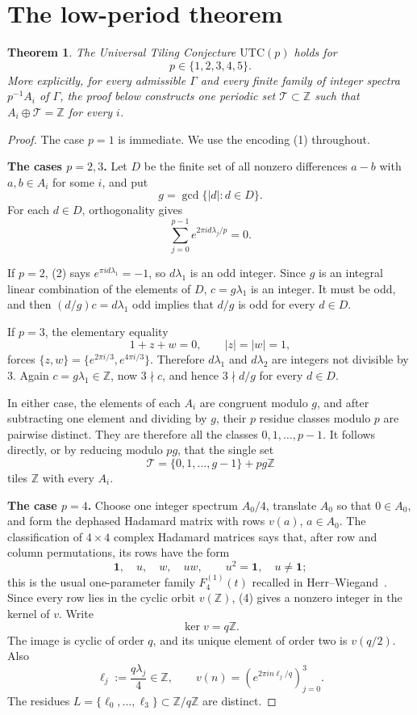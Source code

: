 \documentclass[11pt]{article}
\newtheorem{theorem}{Theorem}
\newcommand{\Z}{\mathbb Z}
\begin{document}
\section{The low-period theorem}

\begin{theorem}\label{main}
The Universal Tiling Conjecture $\mathrm{UTC}(p)$ holds for
\[
 p\in\{1,2,3,4,5\}.
\]
More explicitly, for every admissible $\Gamma$ and every finite family of
integer spectra $p^{-1}A_i$ of $\Gamma$, the proof below constructs one
periodic set $\mathcal T\subset\Z$ such that
$A_i\oplus\mathcal T=\Z$ for every $i$.
\end{theorem}

\begin{proof}
The case $p=1$ is immediate.  We use the encoding (1) throughout.

\medskip
\noindent\textbf{The cases $p=2,3$.}
Let $D$ be the finite set of all nonzero differences $a-b$ with
$a,b\in A_i$ for some $i$, and put
\[
 g=\gcd\{|d|:d\in D\}.
\]
For each $d\in D$, orthogonality gives
\[
 \sum_{j=0}^{p-1}e^{2\pi i d\lambda_j/p}=0.
 \tag{2}
\]

If $p=2$, (2) says
$e^{\pi i d\lambda_1}=-1$, so $d\lambda_1$ is an odd integer.  Since
$g$ is an integral linear combination of the elements of $D$,
$c=g\lambda_1$ is an integer.  It must be odd, and then
$(d/g)c=d\lambda_1$ odd implies that $d/g$ is odd for every $d\in D$.

If $p=3$, the elementary equality
\[
 1+z+w=0,\qquad |z|=|w|=1,
\]
forces $\{z,w\}=\{e^{2\pi i/3},e^{4\pi i/3}\}$.  Therefore
$d\lambda_1$ and $d\lambda_2$ are integers not divisible by $3$.
Again $c=g\lambda_1\in\Z$, now $3\nmid c$, and hence
$3\nmid d/g$ for every $d\in D$.

In either case, the elements of each $A_i$ are congruent modulo $g$, and
after subtracting one element and dividing by $g$, their $p$ residue
classes modulo $p$ are pairwise distinct.  They are therefore all the
classes $0,1,\ldots,p-1$.  It follows directly, or by reducing modulo
$pg$, that the single set
\[
 \mathcal T=\{0,1,\ldots,g-1\}+pg\Z
 \tag{3}
\]
tiles $\Z$ with every $A_i$.

\medskip
\noindent\textbf{The case $p=4$.}
Choose one integer spectrum $A_0/4$, translate $A_0$ so that $0\in A_0$,
and form the dephased Hadamard matrix with rows $v(a)$, $a\in A_0$.
The classification of $4\times4$ complex Hadamard matrices says that,
after row and column permutations, its rows have the form
\[
 \mathbf1,\quad u,\quad w,\quad uw,
 \qquad u^2=\mathbf1,\quad u\ne\mathbf1;
 \tag{4}
\]
this is the usual one-parameter family $F_4^{(1)}(t)$ recalled in
Herr--Wiegand~\cite{herrwiegand}.  Since every row lies in the cyclic
orbit $v(\Z)$, (4) gives a nonzero integer in the kernel of $v$.
Write
\[
 \ker v=q\Z.
\]
The image is cyclic of order $q$, and its unique element of order two is
$v(q/2)$.  Also
\[
 \ell_j:=\frac{q\lambda_j}{4}\in\Z,
 \qquad
 v(n)=\left(e^{2\pi i n\ell_j/q}\right)_{j=0}^3.
 \tag{5}
\]
The residues $L=\{\ell_0,\ldots,\ell_3\}\subset\Z/q\Z$ are distinct.


\end{proof}
\end{document}
